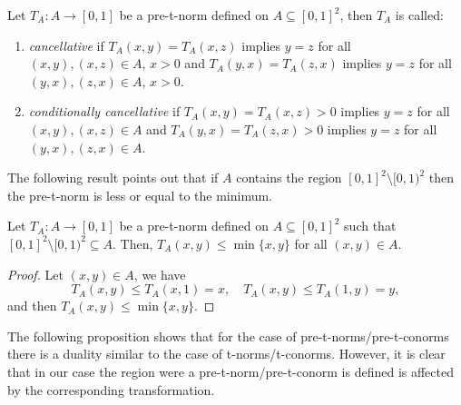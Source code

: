 \begin{definition}\label{def:cancellative} Let $T_A:A \to [0,1]$  be a pre-t-norm defined on $A\subseteq [0,1]^2$, then $T_A$ is called:
	\begin{enumerate}[label=(\alph*)]
		\item \emph{cancellative} if $T_A(x,y)=T_A(x,z)$  implies $y=z$ for all $(x,y),(x,z) \in A$, $x>0$ and  $T_A(y,x)=T_A(z,x)$ implies $y=z$ for all $(y,x),(z,x) \in A$, $x>0$.
		\item \emph{conditionally cancellative} if $T_A(x,y)=T_A(x,z)>0$ implies $y=z$ for all $(x,y),(x,z) \in A$ and $T_A(y,x)=T_A(z,x)>0$ implies $y=z$ for all $(y,x),(z,x) \in A$.
	\end{enumerate}
\end{definition}
The following result points out that if $A$ contains the region $[0,1]^2 \setminus [0,1)^2$ then the pre-t-norm is  less or equal to the minimum.
\begin{proposition}\label{prop:pre-t-norm-minimum} Let $T_A: A \to [0,1]$ be a pre-t-norm defined on $A\subseteq [0,1]^2$ such that $[0,1]^2 \setminus [0,1)^2 \subseteq A$. Then, $T_A(x,y) \leq \min \{x,y\}$ for all $(x,y) \in A$.
\end{proposition}
\begin{proof}
	Let $(x,y) \in A$, we have
	$$T_A(x,y) \leq T_A(x,1) =x, \quad T_A(x,y) \leq T_A(1,y) =y,$$
	and then $T_A(x,y) \leq \min \{x,y\}$.
\end{proof}
The following proposition shows that for the case of pre-t-norms/pre-t-conorms there is a duality similar to the case of t-norms/t-conorms. However, it is clear that in our case the region were a pre-t-norm/pre-t-conorm is defined is affected by the corresponding transformation.
\pagebreak
